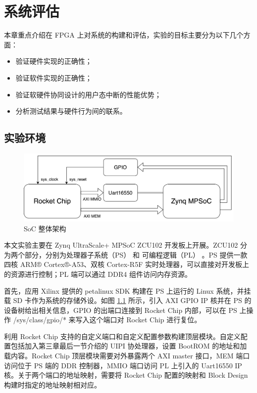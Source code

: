 
\chapter{系统评估}

本章重点介绍在 FPGA 上对系统的构建和评估，实验的目标主要分为以下几个方面：

\begin{itemize}
    \item 验证硬件实现的正确性；
    \item 验证软件实现的正确性；
    \item 验证软硬件协同设计的用户态中断的性能优势；
    \item 分析测试结果与硬件行为间的联系。
\end{itemize}

\section{实验环境}

\begin{figure}
    \centering
    \includegraphics[width=0.8\linewidth]{figures/soc.png}
    \caption{SoC 整体架构}
    \label{fig:soc}
\end{figure}

本文实验主要在 Zynq UltraScale+ MPSoC ZCU102 开发板上开展。ZCU102 分为两个部分，分别为处理器子系统（PS） 和 可编程逻辑（PL） 。PS 提供一款四核 ARM® Cortex®-A53、双核 Cortex-R5F 实时处理器，可以直接对开发板上的资源进行控制；PL 端可以通过 DDR4 组件访问内存资源。

首先，应用 Xilinx 提供的 petalinux SDK 构建在 PS 上运行的 Linux 系统，并挂载 SD 卡作为系统的存储外设。如图 \ref{fig:soc} 所示，引入 AXI GPIO IP 核并在 PS 的设备树给出相关信息，GPIO 的出端口连接到 Rocket Chip 内部，可以在 PS 上操作 /sys/class/gpio/* 来写入这个端口对 Rocket Chip 进行复位。

利用 Rocket Chip 支持的自定义端口和自定义配置参数构建顶层模块。自定义配置包括加入第三章最后一节介绍的 UIPI 协处理器，设置 BootROM 的地址和加载内容。Rocket Chip 顶层模块需要对外暴露两个 AXI master 接口，MEM 端口访问位于 PS 端的 DDR 控制器，MMIO 端口访问 PL 上引入的 Uart16550 IP 核。关于两个端口的地址映射，需要将 Rocket Chip 配置的映射和 Block Design 构建时指定的地址映射相对应。

